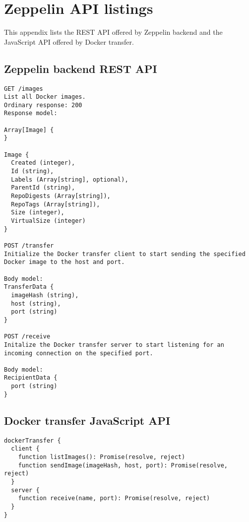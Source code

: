 \chapter{Zeppelin API listings}
\label{app:api}
This appendix lists the REST API offered by Zeppelin backend and the JavaScript API offered by Docker transfer.

\section{Zeppelin backend REST API}

\begin{lstlisting}
GET /images
List all Docker images.
Ordinary response: 200
Response model:

Array[Image] {
}

Image {
  Created (integer),
  Id (string),
  Labels (Array[string], optional),
  ParentId (string),
  RepoDigests (Array[string]),
  RepoTags (Array[string]),
  Size (integer),
  VirtualSize (integer)
}

POST /transfer
Initialize the Docker transfer client to start sending the specified Docker image to the host and port.

Body model:
TransferData {
  imageHash (string),
  host (string),
  port (string)
}

POST /receive
Initalize the Docker transfer server to start listening for an incoming connection on the specified port.

Body model:
RecipientData {
  port (string)
}

\end{lstlisting}

\section{Docker transfer JavaScript API}
\begin{lstlisting}
dockerTransfer {
  client {
    function listImages(): Promise(resolve, reject)
    function sendImage(imageHash, host, port): Promise(resolve, reject) 
  }
  server {
    function receive(name, port): Promise(resolve, reject)
  }
}
\end{lstlisting}